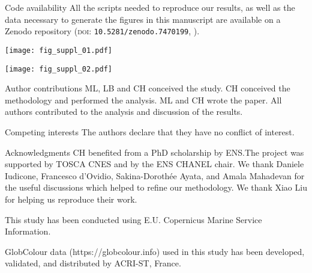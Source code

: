 \begin{articleSubBlock}{Code availability}
    All the scripts needed to reproduce our results, as well as the data necessary to generate the figures in this manuscript are available on a Zenodo repository (\textsc{doi}: \texttt{10.5281/zenodo.7470199}, \cite{haeck_2022_zenodo}).
\end{articleSubBlock}


\begin{figure*}
  \centering
  \texttt{[image: fig\_suppl\_01.pdf]}
  \caption[Sensitivity of the seasonal impact of fronts on HI parameters]{
    Climatological mean of  median values (top row) over weak fronts (blue), strong fronts (green) and background (red), surface fraction occupied by weak fronts and strong fronts (middle row), and global  excess due to weak and strong fronts (bottom row).
    Each line represent a set of parameter with the bolder line indicating the retained set of parameters.
    The tested rolling window sizes are \qty{20}{\km}, \qty{30}{\km}, and \qty{40}{\km}.
    Different normalization coefficients are tested for a \qty{30}{\km} window size: double the variance, double the bimodality, and double the skewness.
  }%
 \label{fig:ts-sensitivity}
\end{figure*}

\begin{figure*}
  \centering
  \texttt{[image: fig\_suppl\_02.pdf]}
  \caption[Seasonal distributions of Chl-\textit{a}]{
    Distribution of  of the year~2007 by seasons~(rows), for the three biomes~(columns), and for the background~(red), weak fronts~(blue) and strong fronts~(green).
    The median value of each distribution is indicated by a vertical line.
  }
  \label{fig:hist-chl}
\end{figure*}

\begin{articleSubBlock}{Author contributions}
  ML, LB and CH conceived the study. CH conceived the methodology and performed the analysis. ML and CH wrote the paper. All authors contributed to the analysis and discussion of the results.
\end{articleSubBlock}

\begin{articleSubBlock}{Competing interests}
  The authors declare that they have no conflict of interest.
\end{articleSubBlock}

\begin{articleSubBlock}{Acknowledgments}
  CH benefited from a PhD scholarship by ENS.\@ The project was supported by TOSCA CNES and by the ENS CHANEL chair.
  We thank Daniele Iudicone, Francesco d'Ovidio, Sakina-Dorothée Ayata, and Amala Mahadevan for the useful discussions which helped to refine our methodology. We thank Xiao Liu for helping us reproduce their work.

  This study has been conducted using E.U. Copernicus Marine Service Information.

  GlobColour data (https://globcolour.info) used in this study has been developed, validated, and distributed by ACRI-ST, France.
\end{articleSubBlock}
